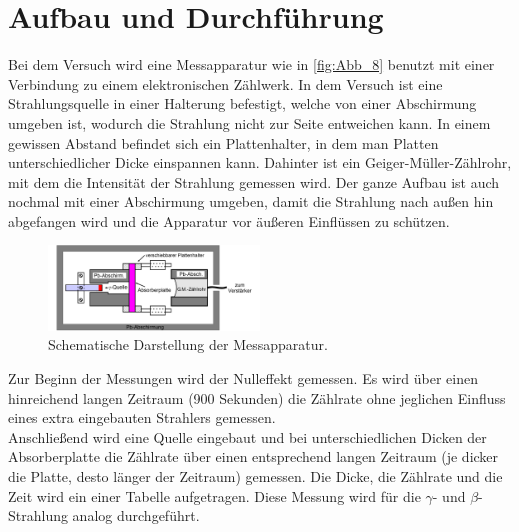 \section{Aufbau und Durchführung}
\label{sec:Durchführung}
Bei dem Versuch wird eine Messapparatur wie in \autoref{fig:Abb_8} benutzt mit einer Verbindung zu einem elektronischen Zählwerk.
In dem Versuch ist eine Strahlungsquelle in einer Halterung befestigt, welche von einer Abschirmung umgeben ist, wodurch die Strahlung nicht zur Seite entweichen kann.
In einem gewissen Abstand befindet sich ein Plattenhalter, in dem man Platten unterschiedlicher Dicke einspannen kann.
Dahinter ist ein Geiger-Müller-Zählrohr, mit dem die Intensität der Strahlung gemessen wird. 
Der ganze Aufbau ist auch nochmal mit einer Abschirmung umgeben, damit die Strahlung nach außen hin abgefangen wird und die Apparatur
vor äußeren Einflüssen zu schützen.
\begin{figure}[H]
    \centering
    \includegraphics[width=0.5\textwidth]{build/Abb_8.png}
    \caption {Schematische Darstellung der Messapparatur\cite[243]{V704}.}
    \label{fig:Abb_8}
\end{figure}
Zur Beginn der Messungen wird der Nulleffekt gemessen. 
Es wird über einen hinreichend langen Zeitraum (900 Sekunden) die Zählrate ohne jeglichen Einfluss eines extra eingebauten Strahlers gemessen.\\
Anschließend wird eine Quelle eingebaut und bei unterschiedlichen Dicken der Absorberplatte die Zählrate über einen entsprechend langen Zeitraum (je dicker die
Platte, desto länger der Zeitraum) gemessen.
Die Dicke, die Zählrate und die Zeit wird ein einer Tabelle aufgetragen.
Diese Messung wird für die $\gamma$- und $\beta$-Strahlung analog durchgeführt.
